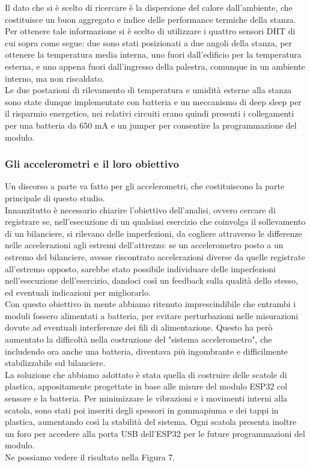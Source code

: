 \documentclass[fleqn,10pt]{SelfArx} %
\begin{document}
Il dato che si è scelto di ricercare è la dispersione del calore dall'ambiente, che costituisce un buon aggregato e 
indice delle performance termiche della stanza.\\
Per ottenere tale informazione si è scelto di utilizzare i quattro sensori DHT di cui sopra come segue: due sono stati 
posizionati a due angoli della stanza, per ottenere la temperatura media interna, uno fuori dall'edificio per la 
temperatura esterna, e uno appena fuori dall'ingresso della palestra, comunque in un ambiente interno, ma non riscaldato.
\\
Le due postazioni di rilevamento di temperatura e umidità esterne alla stanza sono state dunque
implementate con batteria e un meccanismo di deep sleep per il risparmio energetico, nei relativi circuiti erano 
quindi presenti i collegamenti per una batteria da 650 mA e un jumper per consentire la programmazione del modulo.

\subsubsection{Gli accelerometri e il loro obiettivo}

Un discorso a parte va fatto per gli accelerometri, che costituiscono la parte principale di questo studio.\\
Innanzitutto è necessario chiarire l'obiettivo dell'analisi, ovvero cercare di registrare 
se, nell'esecuzione di un qualsiasi esercizio che coinvolga il sollevamento di un bilanciere, si rilevano delle 
imperfezioni, da cogliere attraverso le differenze nelle accelerazioni agli estremi dell'attrezzo: se un accelerometro 
posto a un estremo del bilanciere, avesse riscontrato accelerazioni diverse da quelle registrate 
all'estremo opposto, sarebbe stato possibile individuare delle imperfezioni nell'esecuzione dell'esercizio, 
dandoci così un feedback sulla qualità dello stesso, ed eventuali indicazioni per migliorarlo.\\

Con questo obiettivo in mente abbiamo ritenuto imprescindibile che entrambi i moduli fossero alimentati a batteria, 
per evitare perturbazioni nelle misurazioni dovute ad eventuali interferenze dei fili di alimentazione. Questo ha però 
aumentato la difficoltà nella costruzione del "sistema accelerometro", che includendo ora anche una batteria, 
diventava più ingombrante e difficilmente stabilizzabile sul bilanciere.\\

La soluzione che abbiamo adottato è stata quella di costruire delle scatole di plastica, appositamente 
progettate in base alle misure del modulo ESP32 col sensore e la batteria. Per minimizzare le vibrazioni e i 
movimenti interni alla scatola, sono stati poi inseriti degli spessori in gommapiuma e dei tappi in plastica, 
aumentando così la stabilità del sistema. Ogni scatola presenta inoltre un foro per accedere alla porta USB dell'ESP32 
per le future programmazioni del modulo.\\
Ne possiamo vedere il risultato nella Figura 7.
\end{document}
